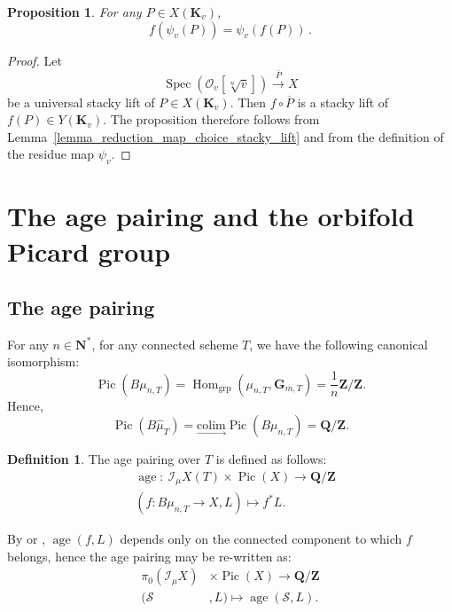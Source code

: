 \documentclass{proc-l}
\newcommand{\Z}{\mathbf{Z}}
\newcommand{\K}{\mathbf{K}}
\newcommand{\N}{\mathbf{N}}
\newcommand{\Q}{\mathbf{Q}}
\newcommand{\G}{\mathbf{G}}
\DeclareMathOperator{\Spec}{Spec}
\DeclareMathOperator{\Pic}{Pic}
\DeclareMathOperator{\grp}{grp}
\DeclareMathOperator{\Hom}{Hom}
\DeclareMathOperator{\age}{age}
\newcommand{\stackS}{\mathcal{S}}
\newcommand{\sheafI}{\mathcal{I}}
\newcommand{\sheafO}{\mathcal{O}}
\newcommand{\sector}{\pi_0(\sheafI_{\mu} X)}
\newtheorem{prop}[theorem]{Proposition}
\theoremstyle{definition}
\newtheorem{definition}[theorem]{Definition}
\theoremstyle{remark}
\numberwithin{equation}{section}
\begin{document}
 \begin{prop}\label{prop_functoriality_residue_map}
For any $P \in X(\K_v)$, $$f \left( \psi_v(P) \right) = \psi_v \left( f(P) \right)  \, .$$
 \end{prop}

\begin{proof}
Let
$$
\Spec(\sheafO_v[\sqrt[n]{v}])
\xrightarrow{\overline P}
X
$$
be a universal stacky lift of $P \in X(\K_v)$. Then $f \circ \overline P$ is a stacky lift of $f(P) \in Y(\K_v)$. The proposition therefore follows from Lemma~\ref{lemma_reduction_map_choice_stacky_lift} and from the definition of the residue map $\psi_v$.
\end{proof}







\section{The age pairing and the orbifold Picard group}

\subsection{The age pairing}

For any $n \in \N^*$, for any connected scheme $T$, we have the following canonical isomorphism: $$\Pic(B \mu_{n,T}) = \Hom_{\grp}(\mu_{n,T},\G_{m,T}) = \frac{1}{n} \Z / \Z .$$Hence, $$\Pic( B \widehat{\mu}_T ) = \underset{\rightarrow}{\text{colim}} \Pic(B \mu_{n,T}) = \Q / \Z .$$

\begin{definition}\label{definition_age_pairing}
    The age pairing over $T$ is defined as follows:
    \begin{align*}
        &\age : \ \sheafI_{\mu} X(T) \times \Pic(X) \rightarrow \Q / \Z \\
        &\left( f : B \mu_{n,T} \rightarrow X , L \right) \longmapsto f^* L .
    \end{align*}
\end{definition}

By \cite[paragraph 7.1]{abramovich2008gromovwittentheorydelignemumfordstacks} or \cite[lemma 2.22]{darda2024batyrevmanin}, $\age(f,L)$ depends only on the connected component to which $f$ belongs, hence the age pairing may be re-written as:
\begin{align*}
    \sector &\times \Pic(X) \rightarrow \Q / \Z \\
    (\stackS&,L) \longmapsto \age(\stackS,L) .
\end{align*}
\end{document}

